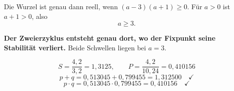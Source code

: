 \begin{aufgabe}
Die Wurzel ist genau dann reell, wenn $(a-3)(a+1) \ge 0$. Für $a > 0$ ist $a+1 > 0$, also
\[ a \ge 3 . \]

\begin{center}
\begin{minipage}{0.9\textwidth}
\textbf{Der Zweierzyklus entsteht genau dort, wo der Fixpunkt seine Stabilität verliert.} Beide Schwellen liegen bei $a = 3$.
\end{minipage}
\end{center}

\[ S = \frac{4{,}2}{3{,}2} = 1{,}3125, \qquad P = \frac{4{,}2}{10{,}24} = 0{,}410156 \]
\[ p + q = 0{,}513045 + 0{,}799455 = 1{,}312500 \quad \checkmark \]
\[ p \cdot q = 0{,}513045 \cdot 0{,}799455 = 0{,}410156 \quad \checkmark \]
\end{aufgabe}

